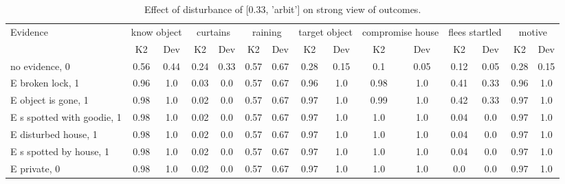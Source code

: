 \begin{table}\begin{tabular}{l|cc|cc|cc|cc|cc|cc|cc}\toprule\multirow{2}{*}{Evidence} & \multicolumn{2}{c}{know object}& \multicolumn{2}{c}{curtains}& \multicolumn{2}{c}{raining}& \multicolumn{2}{c}{target object}& \multicolumn{2}{c}{compromise house}& \multicolumn{2}{c}{flees startled}& \multicolumn{2}{c}{motive}\\& {K2} & {Dev}& {K2} & {Dev}& {K2} & {Dev}& {K2} & {Dev}& {K2} & {Dev}& {K2} & {Dev}& {K2} & {Dev}\\\midrule
no evidence, 0 & \cellcolor{Bittersweet}0.56&\cellcolor{Bittersweet}0.44&\cellcolor{Bittersweet}0.24&\cellcolor{Bittersweet}0.33&\cellcolor{Bittersweet}0.57&\cellcolor{Bittersweet}0.67&\cellcolor{Bittersweet}0.28&\cellcolor{Bittersweet}0.15&\cellcolor{Bittersweet}0.1&\cellcolor{Bittersweet}0.05&\cellcolor{Bittersweet}0.12&\cellcolor{Bittersweet}0.05&\cellcolor{Bittersweet}0.28&\cellcolor{Bittersweet}0.15\\E broken lock, 1 & 0.96&1.0&0.03&0.0&\cellcolor{Bittersweet}0.57&\cellcolor{Bittersweet}0.67&0.96&1.0&0.98&1.0&\cellcolor{Bittersweet}0.41&\cellcolor{Bittersweet}0.33&0.96&1.0\\E object is gone, 1 & 0.98&1.0&0.02&0.0&\cellcolor{Bittersweet}0.57&\cellcolor{Bittersweet}0.67&0.97&1.0&0.99&1.0&\cellcolor{Bittersweet}0.42&\cellcolor{Bittersweet}0.33&0.97&1.0\\E s spotted with goodie, 1 & 0.98&1.0&0.02&0.0&\cellcolor{Bittersweet}0.57&\cellcolor{Bittersweet}0.67&0.97&1.0&1.0&1.0&0.04&0.0&0.97&1.0\\E disturbed house, 1 & 0.98&1.0&0.02&0.0&\cellcolor{Bittersweet}0.57&\cellcolor{Bittersweet}0.67&0.97&1.0&1.0&1.0&0.04&0.0&0.97&1.0\\E s spotted by house, 1 & 0.98&1.0&0.02&0.0&\cellcolor{Bittersweet}0.57&\cellcolor{Bittersweet}0.67&0.97&1.0&1.0&1.0&0.04&0.0&0.97&1.0\\E private, 0 & 0.98&1.0&0.02&0.0&\cellcolor{Bittersweet}0.57&\cellcolor{Bittersweet}0.67&0.97&1.0&1.0&1.0&0.0&0.0&0.97&1.0\\\bottomrule\end{tabular}\caption{Effect of disturbance of [0.33, 'arbit'] on strong view of outcomes.}\end{table}